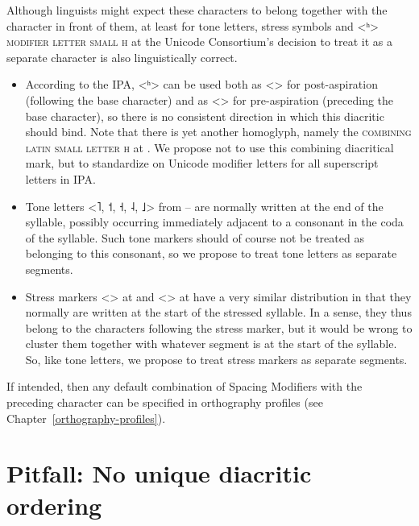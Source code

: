 Although linguists might expect these characters to belong together with the
character in front of them, at least for tone letters, stress symbols and <ʰ>
\textsc{modifier letter small h} at  the Unicode Consortium's decision
to treat it as a separate character is also linguistically correct.

\begin{itemize}
  
   \item According to the IPA, <ʰ> can be used both as <> for
         post-aspiration (following the base character) and as
         <> for pre-aspiration (preceding the base
         character), so there is no consistent direction in which this
         diacritic should bind. Note that there is yet another homoglyph,
         namely the \textsc{combining latin small letter h} at .
         We propose not to use this combining diacritical mark, but to
         standardize on Unicode modifier letters for all superscript
         letters in IPA.
  
   \item Tone letters <˥, ˦, ˧, ˨, ˩> from -- 
   		 are normally written at the end of the syllable,
         possibly occurring immediately adjacent to a consonant in the coda of
         the syllable. Such tone markers should of course not be treated as
         belonging to this consonant, so we propose to treat tone letters as 
         separate segments.
 
   \item Stress markers <> at  and
         <> at  have a very similar
         distribution in that they normally are written at the start of
         the stressed syllable. In a sense, they thus belong to the
         characters following the stress marker, but it would be wrong to
         cluster them together with whatever segment is at the start of
         the syllable. So, like tone letters, we propose to treat stress
         markers as separate segments.
 
\end{itemize}

If intended, then any default combination of Spacing Modifiers
with the preceding character can be specified in orthography profiles (see
Chapter~\ref{orthography-profiles}). 

\section{Pitfall: No unique diacritic ordering}
\label{pitfall-no-unique-diacritic-ordering}

